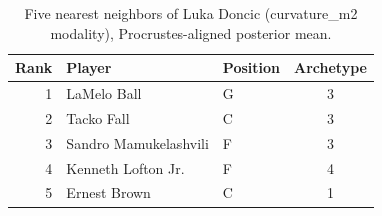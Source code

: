 \begin{table}[htbp]
  \centering\small
  \begin{tabular}{rllc}
    \toprule
    Rank & Player & Position & Archetype \\
    \midrule
    1 & LaMelo Ball & G & 3 \\
    2 & Tacko Fall & C & 3 \\
    3 & Sandro Mamukelashvili & F & 3 \\
    4 & Kenneth Lofton Jr. & F & 4 \\
    5 & Ernest Brown & C & 1 \\
    \bottomrule
  \end{tabular}
  \caption{Five nearest neighbors of Luka Doncic (curvature_m2 modality), Procrustes-aligned posterior mean.}
  \label{tab:Luka_Doncic_neighbors_curvature_m2}
\end{table}

